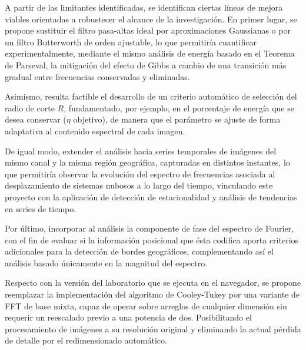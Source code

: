 \documentclass[conference]{IEEEtran}
\begin{document}
A partir de las limitantes identificadas, se identifican ciertas líneas de
mejora viables orientadas a robustecer el alcance de la investigación. En primer lugar, se propone sustituir el filtro pasa-altas ideal por aproximaciones Gaussianas o por un filtro Butterworth de orden ajustable, lo que permitiría
cuantificar experimentalmente, mediante el mismo análisis de energía basado
en el Teorema de Parseval, la mitigación del efecto de Gibbs a cambio de una
transición más gradual entre frecuencias conservadas y eliminadas.
 
Asimismo, resulta factible el desarrollo de un criterio automático de selección
del radio de corte $R$, fundamentado, por ejemplo, en el porcentaje de energía que
se desea conservar ($\eta$ objetivo), de manera que el parámetro se ajuste de
forma adaptativa al contenido espectral de cada imagen.
 
De igual modo, extender el análisis hacia
series temporales de imágenes del mismo canal y la misma región geográfica,
capturadas en distintos instantes, lo que permitiría observar la evolución
del espectro de frecuencias asociada al desplazamiento de sistemas nubosos a
lo largo del tiempo, vinculando este proyecto con la aplicación de detección
de estacionalidad y análisis de tendencias en series de tiempo.
 
Por último, incorporar al análisis la componente de fase del espectro de Fourier, con el fin de evaluar si la información posicional que ésta codifica aporta
criterios adicionales para la detección de bordes geográficos, complementando así el análisis basado únicamente en la magnitud del
espectro.
 
Respecto con la versión del laboratorio que se ejecuta en el navegador, se propone reemplazar la
implementación del algoritmo de Cooley-Tukey por una variante de FFT
de base mixta, capaz de operar sobre arreglos de cualquier dimensión sin
requerir un reescalado previo a una potencia de dos. Posibilitando el procesamiento de imágenes a su resolución original y eliminando la actual pérdida de detalle por el redimensionado automático.



\end{document}
